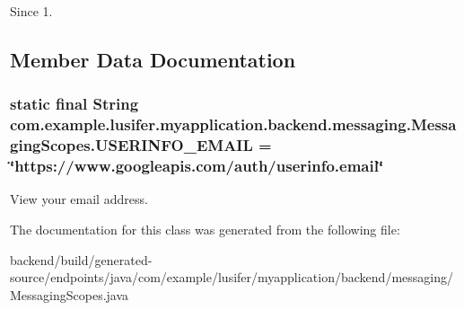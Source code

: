 \begin{DoxySince}{Since}
1. 
\end{DoxySince}


\subsection{Member Data Documentation}
\hypertarget{classcom_1_1example_1_1lusifer_1_1myapplication_1_1backend_1_1messaging_1_1_messaging_scopes_a2356e72a6d956bb15f7c6317c83e536a}{}
\subsubsection[{U\+S\+E\+R\+I\+N\+F\+O\+\_\+\+E\+M\+A\+I\+L}]{\setlength{\rightskip}{0pt plus 5cm}static final String com.\+example.\+lusifer.\+myapplication.\+backend.\+messaging.\+Messaging\+Scopes.\+U\+S\+E\+R\+I\+N\+F\+O\+\_\+\+E\+M\+A\+I\+L = \char`\"{}https\+://www.\+googleapis.\+com/auth/userinfo.\+email\char`\"{}\hspace{0.3cm}{\ttfamily [static]}}\label{classcom_1_1example_1_1lusifer_1_1myapplication_1_1backend_1_1messaging_1_1_messaging_scopes_a2356e72a6d956bb15f7c6317c83e536a}
View your email address. 

The documentation for this class was generated from the following file\+:\begin{DoxyCompactItemize}
\item 
backend/build/generated-\/source/endpoints/java/com/example/lusifer/myapplication/backend/messaging/Messaging\+Scopes.\+java\end{DoxyCompactItemize}
